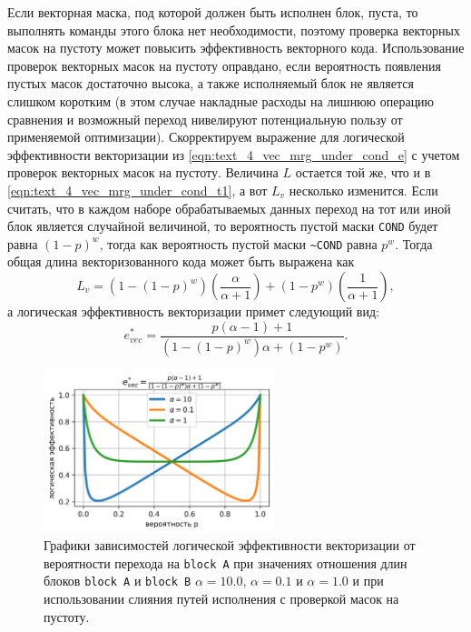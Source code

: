 Если векторная маска, под которой должен быть исполнен блок, пуста, то выполнять команды этого блока нет необходимости, поэтому проверка векторных масок на пустоту может повысить эффективность векторного кода.
Использование проверок векторных масок на пустоту оправдано, если вероятность появления пустых масок достаточно высока, а также исполняемый блок не является слишком коротким (в этом случае накладные расходы на лишнюю операцию сравнения и возможный переход нивелируют потенциальную пользу от применяемой оптимизации).
Скорректируем выражение для логической эффективности векторизации из \eqref{eqn:text_4_vec_mrg_under_cond_e} с учетом проверок векторных масок на пустоту.
Величина $L$ остается той же, что и в \eqref{eqn:text_4_vec_mrg_under_cond_t1}, а вот $L_v$ несколько изменится.
Если считать, что в каждом наборе обрабатываемых данных переход на тот или иной блок является случайной величиной, то вероятность пустой маски \texttt{COND} будет равна $(1 - p)^w$, тогда как вероятность пустой маски \texttt{\textasciitilde COND} равна $p^w$.
Тогда общая длина векторизованного кода может быть выражена как
\begin{equation}\label{eqn:text_4_vec_check_mask_tw}
	L_v = \left(1 - (1 - p)^w\right)\left(\frac{\alpha}{\alpha + 1}\right) + (1 - p^w)\left(\frac{1}{\alpha + 1}\right),
\end{equation}
а логическая эффективность векторизации примет следующий вид:
\begin{equation}\label{eqn:text_4_vec_check_mask_e}
	e_{vec}^{*} = \frac{ p(\alpha - 1) + 1 }{\left(1 - (1 - p)^w\right) \alpha + (1 - p^w) }.
\end{equation}

\begin{figure}[ht]
\centering
\includegraphics[width=0.6\textwidth]{./fig/vec_ifconv_check_chart.png}
\singlespacing
{}\caption{Графики зависимостей логической эффективности векторизации от вероятности перехода на \texttt{block A} при значениях отношения длин блоков \texttt{block A} и \texttt{block B} $\alpha = 10.0$, $\alpha = 0.1$ и $\alpha = 1.0$ и при использовании слияния путей исполнения с проверкой масок на пустоту.}
\label{fig:text_4_vec_check_mask_chart_e_merged}
\end{figure}

